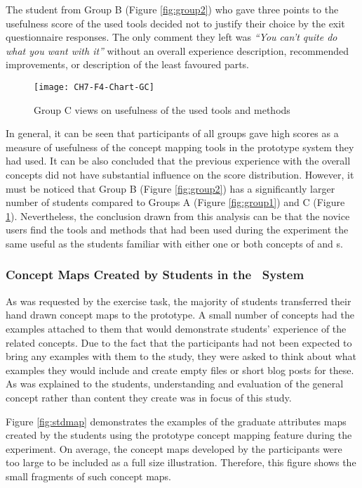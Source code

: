 The student from Group B (Figure \ref{fig:group2}) who gave three points to the
usefulness score of the used tools decided not to justify their choice by the
exit questionnaire responses. The only comment they left was \textit{``You can't
quite do what you want with it''} without an overall experience description,
recommended improvements, or description of the least favoured parts.

\begin{figure}[htb]
\centering
\texttt{[image: CH7-F4-Chart-GC]}
\caption{Group C views on usefulness of the used tools and methods}
\label{fig:group3}
\end{figure}

\FloatBarrier

In general, it can be seen that participants of all groups gave high scores as a
measure of usefulness of the concept mapping tools in the prototype system they
had used. It can be also concluded that the previous experience with the overall
concepts did not have substantial influence on the score distribution. However,
it must be noticed that Group B (Figure \ref{fig:group2}) has a significantly
larger number of students compared to Groups A (Figure \ref{fig:group1}) and C
(Figure \ref{fig:group3}). Nevertheless, the conclusion drawn from this analysis
can be that the novice users find the tools and methods that had been used
during the experiment the same useful as the students familiar with either one
or both concepts of \LLLs and \ep s.

\subsubsection{Concept Maps Created by Students in the \ep~System}

As was requested by the exercise task, the majority of students transferred
their hand drawn concept maps to the prototype. A small number of concepts had
the examples attached to them that would demonstrate students' experience of the
related concepts. Due to the fact that the participants had not been expected to
bring any examples with them to the study, they were asked to think about what
examples they would include and create empty files or short blog posts for
these. As was explained to the students, understanding and evaluation of the
general concept rather than content they create was in focus of this study.

Figure \ref{fig:stdmap} demonstrates the examples of the graduate attributes
maps created by the students using the prototype concept mapping feature during
the experiment. On average, the concept maps developed by the participants were
too large to be included as a full size illustration. Therefore, this figure
shows the small fragments of such concept maps.

